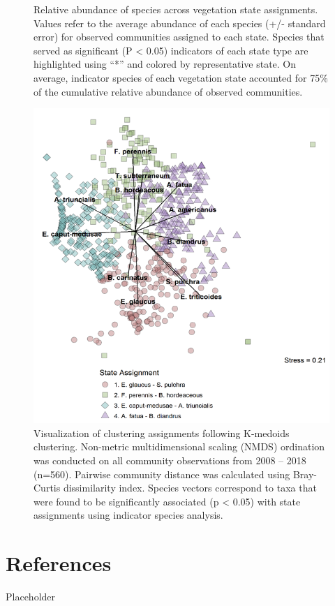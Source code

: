\documentclass[twoside,12pt,final]{ucthesis-CA2012}
\begin{document}
\begin{ucmainmatter}
\begin{figure}
\caption{Relative abundance of species across vegetation state assignments. Values refer to the average abundance of each species (+/- standard error) for observed communities assigned to each state. Species that served as significant (P \textless{} 0.05) indicators of each state type are highlighted using ``*'' and colored by representative state. On average, indicator species of each vegetation state accounted for 75\% of the cumulative relative abundance of observed communities. \label{app-3-2}}
\end{figure}
\begin{figure}
\centering
\includegraphics[width=\textwidth,height=0.8\textheight]{figure/Fig3_2.png}
\caption{Visualization of clustering assignments following K-medoids clustering. Non-metric multidimensional scaling (NMDS) ordination was conducted on all community observations from 2008 -- 2018 (n=560). Pairwise community distance was calculated using Bray-Curtis dissimilarity index. Species vectors correspond to taxa that were found to be significantly associated (p \textless{} 0.05) with state assignments using indicator species analysis. \label{app-3-3}}
\end{figure}
\hypertarget{references}{%
\chapter*{References}\label{references}}

Placeholder

\end{ucmainmatter}
\end{document}
